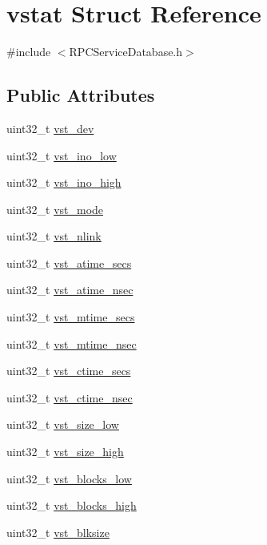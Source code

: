 \hypertarget{structvstat}{\section{vstat Struct Reference}
\label{structvstat}
}


{\ttfamily \#include $<$R\+P\+C\+Service\+Database.\+h$>$}

\subsection*{Public Attributes}
\begin{DoxyCompactItemize}
\item 
uint32\+\_\+t \hyperlink{structvstat_ad664bbf80086ae1b6021d0010ac6493a}{vst\+\_\+dev}
\item 
uint32\+\_\+t \hyperlink{structvstat_a1e1b8f04a8182cdd13d47c056fb6a25b}{vst\+\_\+ino\+\_\+low}
\item 
uint32\+\_\+t \hyperlink{structvstat_a755cd9bc35f733661c6a4f4df433fea8}{vst\+\_\+ino\+\_\+high}
\item 
uint32\+\_\+t \hyperlink{structvstat_a78eea0375dc317473064e4dc1acc7f2b}{vst\+\_\+mode}
\item 
uint32\+\_\+t \hyperlink{structvstat_af222b7b822a59063156c71ae2abef50a}{vst\+\_\+nlink}
\item 
uint32\+\_\+t \hyperlink{structvstat_a736e9b40935eb78b600975b529920036}{vst\+\_\+atime\+\_\+secs}
\item 
uint32\+\_\+t \hyperlink{structvstat_aed30c48942d765f66bbb37090db6b688}{vst\+\_\+atime\+\_\+nsec}
\item 
uint32\+\_\+t \hyperlink{structvstat_a7e20cca05929c6d5d14d225b7314045a}{vst\+\_\+mtime\+\_\+secs}
\item 
uint32\+\_\+t \hyperlink{structvstat_a6e27926dc04ae8d48041115255d6b916}{vst\+\_\+mtime\+\_\+nsec}
\item 
uint32\+\_\+t \hyperlink{structvstat_a737fd4f9bed2ffdb90a65db32d45a60a}{vst\+\_\+ctime\+\_\+secs}
\item 
uint32\+\_\+t \hyperlink{structvstat_ab6e7c6c85a6fd08ecf10dad3604ceea3}{vst\+\_\+ctime\+\_\+nsec}
\item 
uint32\+\_\+t \hyperlink{structvstat_ae4ae30291cc797b7bd15e444f8daa59b}{vst\+\_\+size\+\_\+low}
\item 
uint32\+\_\+t \hyperlink{structvstat_a78ee9821e278bb2d8c1a71fe187e5e00}{vst\+\_\+size\+\_\+high}
\item 
uint32\+\_\+t \hyperlink{structvstat_a54e9d0d71875f5b0de6463b57bbb23b2}{vst\+\_\+blocks\+\_\+low}
\item 
uint32\+\_\+t \hyperlink{structvstat_a6003873e75b89f59bab19597509b4a02}{vst\+\_\+blocks\+\_\+high}
\item 
uint32\+\_\+t \hyperlink{structvstat_a2adc2cc94403fbbd36f0e8404b1a9da5}{vst\+\_\+blksize}
\end{DoxyCompactItemize}


